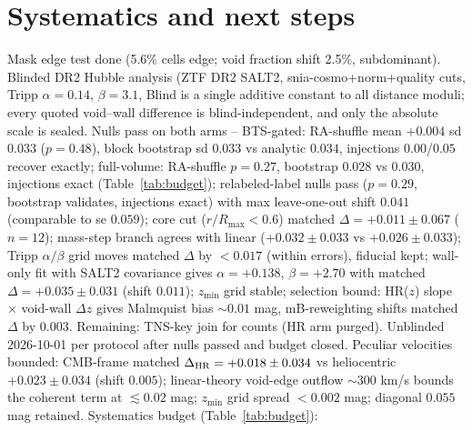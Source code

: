 \section{Systematics and next steps}
Mask edge test done (5.6\% cells edge; void fraction shift 2.5\%, subdominant). Blinded DR2 Hubble analysis (ZTF DR2 SALT2, snia-cosmo+norm+quality cuts, Tripp $\alpha=0.14$, $\beta=3.1$, Blind is a single additive constant to all distance moduli; every quoted void--wall difference is blind-independent, and only the absolute scale is sealed. Nulls pass on both arms -- BTS-gated: RA-shuffle mean $+0.004$ sd $0.033$ ($p=0.48$), block bootstrap sd $0.033$ vs analytic $0.034$, injections $0.00$/$0.05$ recover exactly; full-volume: RA-shuffle $p=0.27$, bootstrap $0.028$ vs $0.030$, injections exact (Table~\ref{tab:budget}); relabeled-label nulls pass ($p=0.29$, bootstrap validates, injections exact) with max leave-one-out shift $0.041$ (comparable to se $0.059$); core cut ($r/R_{\max}<0.6$) matched $\Delta=+0.011\pm0.067$ ($n=12$); mass-step branch agrees with linear ($+0.032\pm0.033$ vs $+0.026\pm0.033$); Tripp $\alpha/\beta$ grid moves matched $\Delta$ by $<0.017$ (within errors), fiducial kept; wall-only fit with SALT2 covariance gives $\alpha=+0.138$, $\beta=+2.70$ with matched $\Delta=+0.035\pm0.031$ (shift $0.011$); $z_{\min}$ grid stable; selection bound: HR($z$) slope $\times$ void-wall $\Delta z$ gives Malmquist bias $\sim0.01$ mag, mB-reweighting shifts matched $\Delta$ by $0.003$. Remaining: TNS-key join for counts (HR arm purged). Unblinded 2026-10-01 per protocol after nulls passed and budget closed. Peculiar velocities bounded: CMB-frame matched $\Delta_{\rm HR}=+0.018\pm0.034$ vs heliocentric $+0.023\pm0.034$ (shift $0.005$); linear-theory void-edge outflow $\sim300$ km/s bounds the coherent term at $\lesssim0.02$ mag; $z_{\min}$ grid spread $<0.002$ mag; diagonal $0.055$ mag retained. Systematics budget (Table~\ref{tab:budget}):

